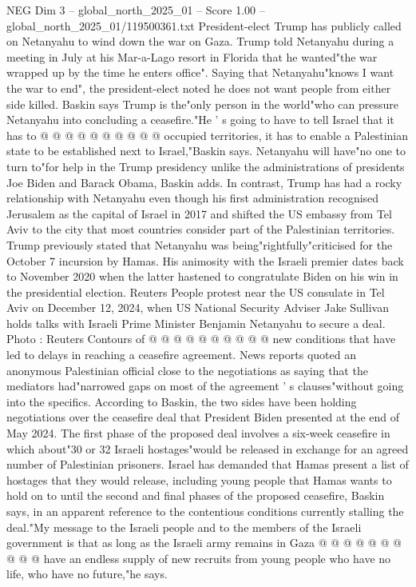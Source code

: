 \begin{textsample}{NEG Dim 3 – global\_north\_2025\_01 – Score 1.00 – global\_north\_2025\_01/119500361.txt}
President-elect Trump has publicly called on Netanyahu to wind down the war on Gaza.
Trump told Netanyahu during a meeting in July at his Mar-a-Lago resort in Florida that he wanted"the war wrapped up by the time he enters office".
Saying that Netanyahu"knows I want the war to end", the president-elect noted he does not want people from either side killed.
Baskin says Trump is the"only person in the world"who can pressure Netanyahu into concluding a ceasefire."He ' s going to have to tell Israel that it has to @ @ @ @ @ @ @ @ @ @ occupied territories, it has to enable a Palestinian state to be established next to Israel,"Baskin says.
Netanyahu will have"no one to turn to"for help in the Trump presidency unlike the administrations of presidents Joe Biden and Barack Obama, Baskin adds.
In contrast, Trump has had a rocky relationship with Netanyahu even though his first administration recognised Jerusalem as the capital of Israel in 2017 and shifted the US embassy from Tel Aviv to the city that most countries consider part of the Palestinian territories.
Trump previously stated that Netanyahu was being"rightfully"criticised for the October 7 incursion by Hamas.
His animosity with the Israeli premier dates back to November 2020 when the latter hastened to congratulate Biden on his win in the presidential election.
Reuters People protest near the US consulate in Tel Aviv on December 12, 2024, when US National Security Adviser Jake Sullivan holds talks with Israeli Prime Minister Benjamin Netanyahu to secure a deal.
Photo : Reuters Contours of @ @ @ @ @ @ @ @ @ @ new conditions that have led to delays in reaching a ceasefire agreement.
News reports quoted an anonymous Palestinian official close to the negotiations as saying that the mediators had"narrowed gaps on most of the agreement ' s clauses"without going into the specifics.
According to Baskin, the two sides have been holding negotiations over the ceasefire deal that President Biden presented at the end of May 2024.
The first phase of the proposed deal involves a six-week ceasefire in which about"30 or 32 Israeli hostages"would be released in exchange for an agreed number of Palestinian prisoners.
Israel has demanded that Hamas present a list of hostages that they would release, including young people that Hamas wants to hold on to until the second and final phases of the proposed ceasefire, Baskin says, in an apparent reference to the contentious conditions currently stalling the deal."My message to the Israeli people and to the members of the Israeli government is that as long as the Israeli army remains in Gaza @ @ @ @ @ @ @ @ @ @ have an endless supply of new recruits from young people who have no life, who have no future,"he says.

\end{textsample}
